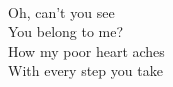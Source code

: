 \\
Oh, can't you see \\
You belong to me? \\
How my poor heart aches \\
With every step you take \\

